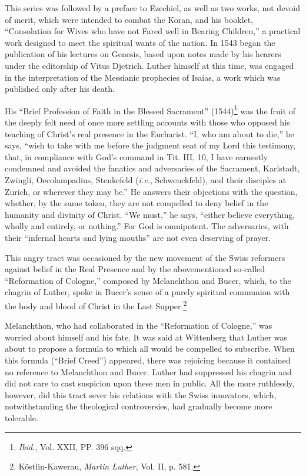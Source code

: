This series was followed by a preface to Ezechiel, as well as two
works, not devoid of merit, which were intended to combat the
Koran, and his booklet, “Consolation for Wives who have not Fared
well in Bearing Children,” a practical work designed to meet the
spiritual wants of the nation. In 1543 began the publication of his
lectures on Genesis, based upon notes made by his hearers under the
editorship of Vitus Djetrich. Luther himself at this time, was engaged
in the interpretation of the Messianic prophecies of Isaias, a work
which was published only after his death.

His “Brief Profession of Faith in the Blessed Sacrament” (1544)\footnote{\textit{Ibid.}, Vol. XXII, PP. 396 sqq.}
was the fruit of the deeply felt need of once more settling accounts
with those who opposed his teaching of Christ’s real presence in the
Eucharist. “I, who am about to die,” he says, “wish to take with me
before the judgment seat of my Lord this testimony, that, in compliance
with God’s command in Tit. III, 10, I have earnestly condemned and avoided
the fanatics and adversaries of the Sacrament,
Karlstadt, Zwingli, Oecolampadius, Stenkefeld (\textit{i.e.}, Schwenckfeld),
and their disciples at Zurich, or wherever they may be.” He answers
their objections with the question, whether, by the same token, they
are not compelled to deny belief in the humanity and divinity of
Christ. “We must,” he says, “either believe everything, wholly and
entirely, or nothing.” For God is omnipotent. The adversaries, with
their “infernal hearts and lying mouths” are not even deserving of
prayer.

This angry tract was occasioned by the new movement of the Swiss
reformers against belief in the Real Presence and by the abovementioned
so-called “Reformation of Cologne,” composed by Melanchthon and Bucer,
which, to the chagrin of Luther, spoke in
Bucer’s sense of a purely spiritual communion with the body and blood
of Christ in the Last Supper.\footnote{Köstlin-Kawerau, \textit{Martin Luther}, Vol. II, p. 581.}

Melanchthon, who had collaborated in
the “Reformation of Cologne,” was worried about himself and his
fate. It was said at Wittenberg that Luther was about to propose a
formula to which all would be compelled to subscribe. When this
formula (“Brief Creed”) appeared, there was rejoicing because it
contained no reference to Melanchthon and Bucer. Luther had suppressed
his chagrin and did not care to cast suspicion upon these men
in public. All the more ruthlessly, however, did this tract sever his
relations with the Swiss innovators, which, notwithstanding the theological
controversies, had gradually become more tolerable.


